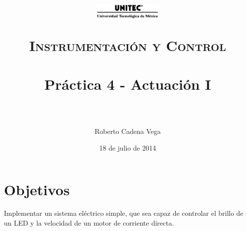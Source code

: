 



\title{
	\normalfont \normalsize
	\begin{figure}[h]
		\centering \includegraphics[width=0.3\textwidth]{../images/UNITEC.png}
	\end{figure}
	\textsc{Instrumentación y Control} \\ [25pt]
	\horrule{0.5pt} \\[0.4cm] %
	\huge Práctica 4 - Actuación I \\ %
	\horrule{2pt} \\[0.5cm] %
}

\author{Roberto Cadena Vega} %

\date{\normalsize 18 de julio de 2014} %




\maketitle %


\section{Objetivos}

	Implementar un sistema eléctrico simple, que sea capaz de controlar el brillo de un LED y la velocidad de un motor de corriente directa.


